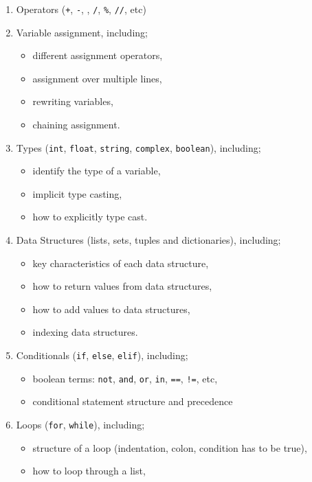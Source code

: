 \documentclass[11pt]{report}
\begin{document}
\begin{enumerate}[leftmargin=*]
    \item Operators ({\tt +}, {\tt -}, {\tt *}, {\tt /}, {\tt \%}, {\tt //}, etc)
    \item Variable assignment, including;
    \begin{itemize}
        \item different assignment operators,
        \item assignment over multiple lines,
        \item rewriting variables,
        \item chaining assignment.
    \end{itemize}
    \item Types ({\tt int}, {\tt float}, {\tt string}, {\tt complex}, {\tt boolean}), including;
    \begin{itemize}
        \item identify the type of a variable,
        \item implicit type casting,
        \item how to explicitly type cast.
    \end{itemize}
    \item Data Structures (lists, sets, tuples and dictionaries), including;
    \begin{itemize}
        \item key characteristics of each data structure,
        \item how to return values from data structures,
        \item how to add values to data structures,
        \item indexing data structures.
    \end{itemize}
    \item Conditionals ({\tt if}, {\tt else}, {\tt elif}), including;
    \begin{itemize}
        \item boolean terms: {\tt not}, {\tt and}, {\tt or}, {\tt in}, {\tt ==}, {\tt !=}, etc,
        \item conditional statement structure and precedence
    \end{itemize}
    \item Loops ({\tt for}, {\tt while}), including;
    \begin{itemize}
        \item structure of a loop (indentation, colon, condition has to be true),
        \item how to loop through a list,

\end{itemize}
\end{enumerate}
\end{document}
